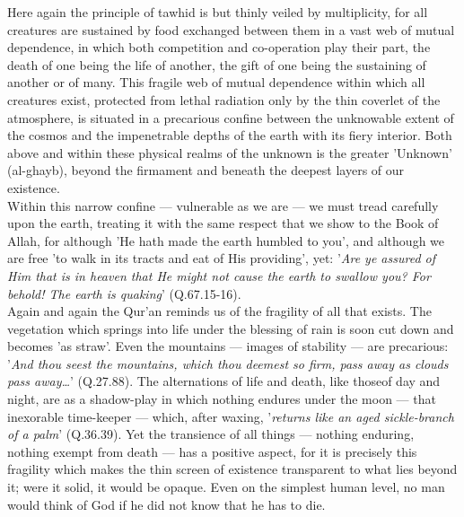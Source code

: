 \documentclass[11pt, b5paper, twoside]{book}
\begin{document}
Here again the principle of tawhid is but thinly veiled by multiplicity, for all creatures are 
sustained by food exchanged between them in a vast web of mutual dependence, in which both 
competition and co-operation play their part, the death of one being the life of another, the gift of 
one being the sustaining of another or of many. This fragile web of mutual dependence within which 
all creatures exist, protected from lethal radiation only by the thin coverlet of the atmosphere, is 
situated in a precarious confine between the unknowable extent of the cosmos and the impenetrable 
depths of the earth with its fiery interior. Both above and within these physical realms of the 
unknown is the greater 'Unknown' (al-ghayb), beyond the firmament and beneath the deepest layers of 
our existence. \\

Within this narrow confine --- vulnerable as we are --- we must tread carefully upon the earth, treating 
it with the same respect that we show to the Book of Allah, for although 'He hath made the earth 
humbled to you', and although we are free 'to walk in its tracts and eat of His providing', yet: '\emph{Are 
ye assured of Him that is in heaven that He might not cause the earth to swallow you? For behold! The 
earth is quaking}' (Q.67.15-16). \\

Again and again the Qur'an reminds us of the fragility of all that exists. The vegetation which 
springs into life under the blessing of rain is soon cut down and becomes 'as straw'. Even the 
mountains --- images of stability --- are precarious: '\emph{And thou seest the mountains, which thou deemest so firm, pass away as clouds pass away\ldots{}}' (Q.27.88). The alternations of life and death, like thoseof day and night, are as a shadow-play in which nothing endures under the moon --- that inexorable time-keeper --- which, after waxing, '\emph{returns like an aged sickle-branch of a palm}' (Q.36.39). Yet the transience of all things --- nothing enduring, nothing exempt from death --- has a positive aspect, for it is precisely this fragility which makes the thin screen of existence transparent to what lies beyond it; were it solid, it would be opaque. Even on the simplest human level, no man would think of God if he did not know that he has to die. \\
\end{document}
